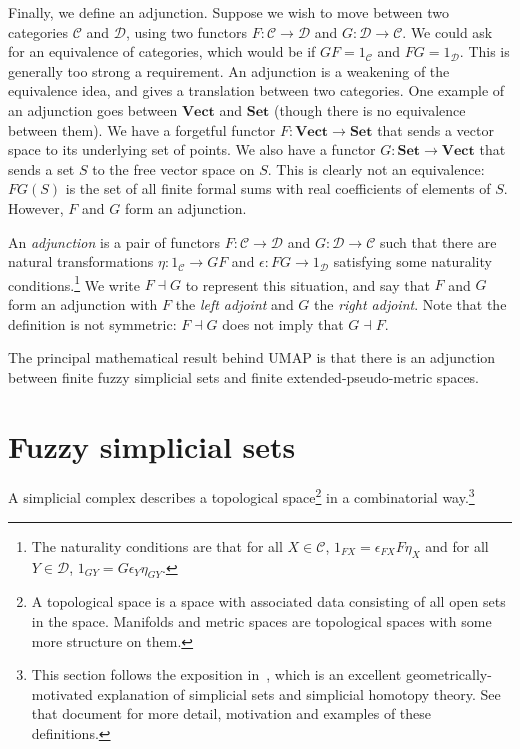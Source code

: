 \documentclass[a4paper,11pt,leqno]{article}
\newcommand{\curC}{\mathscr{C}}
\newcommand{\curD}{\mathscr{D}}
\theoremstyle{definition}
\begin{document}
Finally, we define an adjunction.
Suppose we wish to move between two categories $\curC$ and $\curD$, using two functors $F: \curC\to\curD$ and $G: \curD\to\curC$.
We could ask for an equivalence of categories, which would be if $GF = 1_{\curC}$ and $FG = 1_{\curD}$.
This is generally too strong a requirement.
An adjunction is a weakening of the equivalence idea, and gives a translation between two categories.
One example of an adjunction goes between $\textbf{Vect}$ and $\textbf{Set}$ (though there is no equivalence between them).
We have a forgetful functor $F: \textbf{Vect}\to \textbf{Set}$ that sends a vector space to its underlying set of points.
We also have a functor $G: \textbf{Set}\to \textbf{Vect}$ that sends a set $S$ to the free vector space on $S$.
This is clearly not an equivalence: $FG(S)$ is the set of all finite formal sums with real coefficients of elements of $S$.
However, $F$ and $G$ form an adjunction.

An \emph{adjunction} is a pair of functors $F: \curC\to\curD$ and $G: \curD\to\curC$ such that there are natural transformations $\eta: 1_\curC\to GF$ and $\epsilon: FG\to 1_\curD$ satisfying some naturality conditions.\footnote{
The naturality conditions are that for all $X\in\curC$, $1_{FX} = \epsilon_{FX}F\eta_X$ and for all $Y\in\curD$, $1_{GY} = G\epsilon_Y\eta_{GY}$.}
We write $F\dashv G$ to represent this situation, and say that $F$ and $G$ form an adjunction with $F$ the \emph{left adjoint} and $G$ the \emph{right adjoint}.
Note that the definition is not symmetric: $F\dashv G$ does not imply that $G\dashv F$.

The principal mathematical result behind UMAP is that there is an adjunction between finite fuzzy simplicial sets and finite extended-pseudo-metric spaces.

\section{Fuzzy simplicial sets}

A simplicial complex describes a topological space\footnote{
A topological space is a space with associated data consisting of all open sets in the space. Manifolds and metric spaces are topological spaces with some more structure on them.} in a combinatorial way.\footnote{
This section follows the exposition in~\cite{Friedman08}, which is an excellent geometrically-motivated explanation of simplicial sets and simplicial homotopy theory. See that document for more detail, motivation and examples of these definitions.}
\end{document}
